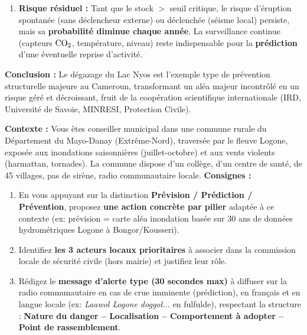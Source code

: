 \documentclass[11pt]{article}
\begin{document}
\begin{exoresolu}
\begin{enumerate}
    \item \textbf{Risque résiduel :} Tant que le stock $>$ seuil critique, le risque d'éruption spontanée (sans déclencheur externe) ou déclenchée (séisme local) persiste, mais sa \textbf{probabilité diminue chaque année}. La surveillance continue (capteurs $\ce{CO2}$, température, niveau) reste indispensable pour la \textbf{prédiction} d'une éventuelle reprise d'activité.
\end{enumerate}
\textbf{Conclusion :} Le dégazage du Lac Nyos est l'exemple type de prévention structurelle majeure au Cameroun, transformant un aléa majeur incontrôlé en un risque géré et décroissant, fruit de la coopération scientifique internationale (IRD, Université de Savoie, MINRESI, Protection Civile).
\end{exoresolu}

\begin{exercice}
\textbf{Contexte :} Vous êtes conseiller municipal dans une commune rurale du Département du Mayo-Danay (Extrême-Nord), traversée par le fleuve Logone, exposée aux inondations saisonnières (juillet-octobre) et aux vents violents (harmattan, tornades). La commune dispose d'un collège, d'un centre de santé, de 45 villages, pas de sirène, radio communautaire locale.
\textbf{Consignes :}
\begin{enumerate}
    \item En vous appuyant sur la distinction \textbf{Prévision / Prédiction / Prévention}, proposez \textbf{une action concrète par pilier} adaptée à ce contexte (ex: prévision = carte aléa inondation basée sur 30 ans de données hydrométriques Logone à Bongor/Kousseri).
    \item Identifiez \textbf{les 3 acteurs locaux prioritaires} à associer dans la commission locale de sécurité civile (hors mairie) et justifiez leur rôle.
    \item Rédigez le \textbf{message d'alerte type (30 secondes max)} à diffuser sur la radio communautaire en cas de crue imminente (prédiction), en français et en langue locale (ex: \og \emph{Laawol Logone doggol...} \fg en fulfulde), respectant la structure : \textbf{Nature du danger -- Localisation -- Comportement à adopter -- Point de rassemblement}.
\end{enumerate}
\end{exercice}
\end{document}
